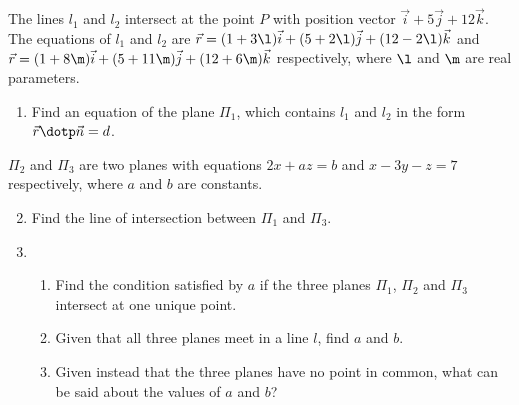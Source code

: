 \begin{problem}
    The lines $l_1$ and $l_2$ intersect at the point $P$ with position vector $\vec i + 5 \vec j + 12 \vec k$. The equations of $l_1$ and $l_2$ are $\vec r = (1 + 3\l)\vec i + (5 + 2\l)\vec j + (12 - 2\l)\vec k$ and $\vec r = (1 + 8\m)\vec i + (5 + 11\m)\vec j + (12 + 6\m) \vec k$ respectively, where $\l$ and $\m$ are real parameters.

    \begin{enumerate}
        \item Find an equation of the plane $\Pi_1$, which contains $l_1$ and $l_2$ in the form $\vec r \dotp \vec n = d$.
    \end{enumerate}

    $\Pi_2$ and $\Pi_3$ are two planes with equations $2x + az = b$ and $x - 3y - z = 7$ respectively, where $a$ and $b$ are constants.

    \begin{enumerate}
        \setcounter{enumi}{1}
        \item Find the line of intersection between $\Pi_1$ and $\Pi_3$.
        \item \begin{enumerate}
            \item Find the condition satisfied by $a$ if the three planes $\Pi_1$, $\Pi_2$ and $\Pi_3$ intersect at one unique point.
            \item Given that all three planes meet in a line $l$, find $a$ and $b$.
            \item Given instead that the three planes have no point in common, what can be said about the values of $a$ and $b$?
        \end{enumerate}
    \end{enumerate}
\end{problem}
